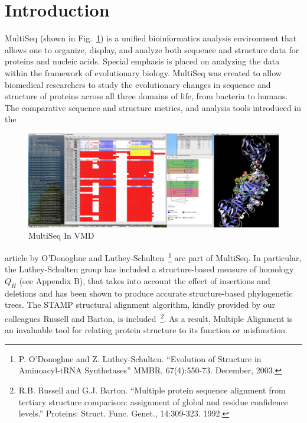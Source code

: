 \label{unit0}


\section{Introduction}



MultiSeq 
(shown in Fig.~\ref{fullDisplay}) 
is a unified bioinformatics analysis environment that allows one to
organize, display, and analyze both sequence and structure data for
proteins and nucleic acids. Special emphasis is placed on analyzing the
data within the framework of evolutionary biology.
MultiSeq was created to allow biomedical researchers to study the
evolutionary changes in sequence and structure of proteins across all
three domains of life, from bacteria to humans.  The comparative
sequence and structure metrics, and analysis tools introduced in the
\begin{figure}[here]
 \centerline{\includegraphics [width=5in]{./pictures/fullDisplay.jpg}}
 \caption{MultiSeq In VMD}
\label{fullDisplay}
\end{figure}
article by O'Donoghue and Luthey-Schulten~\footnote {P.
O'Donoghue and Z. Luthey-Schulten. ``Evolution of Structure in
Aminoacyl-tRNA Synthetases''  MMBR, 67(4):550-73.  December, 2003. }
are part of MultiSeq.   In particular,  the Luthey-Schulten
group has included a structure-based measure of
homology \begin{math} Q_H \end{math} (see Appendix B), that takes into
account the effect of insertions and deletions and has been shown to
produce accurate structure-based phylogenetic trees.  The STAMP
structural alignment algorithm, kindly provided by our colleagues
Russell and Barton, is included~\footnote {R.B.
Russell and G.J. Barton. ``Multiple protein sequence alignment from
tertiary structure comparison: assignment of global and residue
confidence levels.''  Proteins: Struct. Func. Genet., 14:309-323.  1992.
}.  
As a result, Multiple Alignment is an invaluable tool for relating
protein structure to its function or misfunction.

